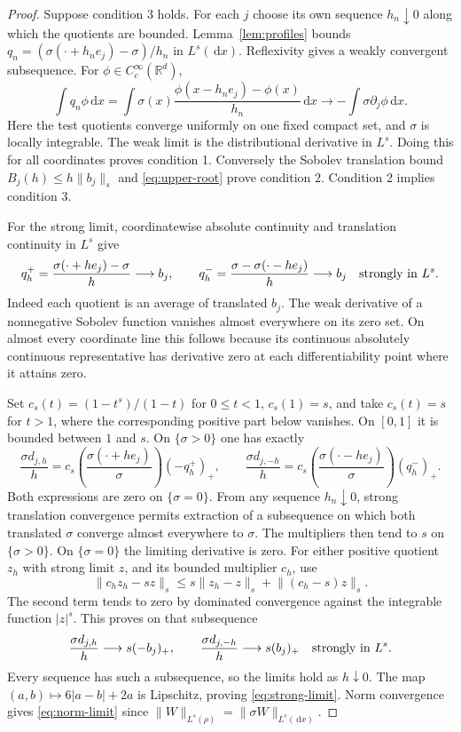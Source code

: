 \documentclass[11pt]{article}
\theoremstyle{remark}\newtheorem{remark}[theorem]{Remark}
\newcommand{\R}{\mathbb R}
\newcommand{\dd}{\,\mathrm d}
\newcommand{\norm}[1]{\lVert#1\rVert}
\begin{document}
\begin{proof}
Suppose condition 3 holds. For each $j$ choose its own sequence $h_n\downarrow0$ along which the quotients are bounded. Lemma~\ref{lem:profiles} bounds
$q_n=(\sigma(\cdot+h_ne_j)-\sigma)/h_n$ in $L^s(\dd x)$. Reflexivity gives a weakly convergent subsequence. For $\phi\in C_c^\infty(\R^d)$,
\[
 \int q_n\phi\dd x
 =\int\sigma(x)\frac{\phi(x-h_ne_j)-\phi(x)}{h_n}\dd x
 \longrightarrow-\int\sigma\partial_j\phi\dd x.
\]
Here the test quotients converge uniformly on one fixed compact set, and $\sigma$ is locally integrable. The weak limit is the distributional derivative in $L^s$. Doing this for all coordinates proves condition 1. Conversely the Sobolev translation bound $B_j(h)\le h\norm{b_j}_s$ and \eqref{eq:upper-root} prove condition 2. Condition 2 implies condition 3.

For the strong limit, coordinatewise absolute continuity and translation continuity in $L^s$ give
\[
 q_h^+=\frac{\sigma(\cdot+he_j)-\sigma}h\longrightarrow b_j,
 \qquad q_h^-=\frac{\sigma-\sigma(\cdot-he_j)}h\longrightarrow b_j
 \quad\hbox{strongly in }L^s.
\]
Indeed each quotient is an average of translated $b_j$. The weak derivative of a nonnegative Sobolev function vanishes almost everywhere on its zero set. On almost every coordinate line this follows because its continuous absolutely continuous representative has derivative zero at each differentiability point where it attains zero.

Set $c_s(t)=(1-t^s)/(1-t)$ for $0\le t<1$, $c_s(1)=s$, and take $c_s(t)=s$ for $t>1$, where the corresponding positive part below vanishes. On $[0,1]$ it is bounded between $1$ and $s$. On $\{\sigma>0\}$ one has exactly
\[
 \frac{\sigma d_{j,h}}h
 =c_s\left(\frac{\sigma(\cdot+he_j)}\sigma\right)(-q_h^+)_+,
 \qquad
 \frac{\sigma d_{j,-h}}h
 =c_s\left(\frac{\sigma(\cdot-he_j)}\sigma\right)(q_h^-)_+.
\]
Both expressions are zero on $\{\sigma=0\}$. From any sequence $h_n\downarrow0$, strong translation convergence permits extraction of a subsequence on which both translated $\sigma$ converge almost everywhere to $\sigma$. The multipliers then tend to $s$ on $\{\sigma>0\}$. On $\{\sigma=0\}$ the limiting derivative is zero.
For either positive quotient $z_h$ with strong limit $z$, and its bounded multiplier $c_h$, use
\[
 \norm{c_hz_h-sz}_s\le s\norm{z_h-z}_s+
                              \norm{(c_h-s)z}_s.
\]
The second term tends to zero by dominated convergence against the integrable function $|z|^s$. This proves on that subsequence
\[
 \frac{\sigma d_{j,h}}h\longrightarrow s(-b_j)_+,
 \qquad \frac{\sigma d_{j,-h}}h\longrightarrow s(b_j)_+
 \quad\hbox{strongly in }L^s.
\]
Every sequence has such a subsequence, so the limits hold as $h\downarrow0$. The map $(a,b)\mapsto6|a-b|+2a$ is Lipschitz, proving \eqref{eq:strong-limit}. Norm convergence gives \eqref{eq:norm-limit} since $\norm{W}_{L^s(\rho)}=\norm{\sigma W}_{L^s(\dd x)}$.
\end{proof}
\end{document}
